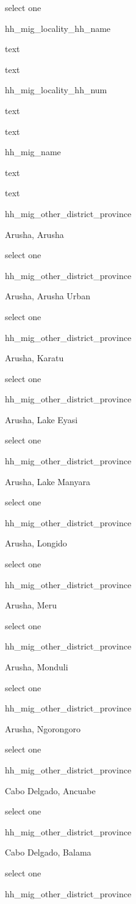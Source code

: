 \documentclass[]{article}
\begin{document}
select one

hh\_mig\_locality\_hh\_name

text

text

hh\_mig\_locality\_hh\_num

text

text

hh\_mig\_name

text

text

hh\_mig\_other\_district\_province

Arusha, Arusha

select one

hh\_mig\_other\_district\_province

Arusha, Arusha Urban

select one

hh\_mig\_other\_district\_province

Arusha, Karatu

select one

hh\_mig\_other\_district\_province

Arusha, Lake Eyasi

select one

hh\_mig\_other\_district\_province

Arusha, Lake Manyara

select one

hh\_mig\_other\_district\_province

Arusha, Longido

select one

hh\_mig\_other\_district\_province

Arusha, Meru

select one

hh\_mig\_other\_district\_province

Arusha, Monduli

select one

hh\_mig\_other\_district\_province

Arusha, Ngorongoro

select one

hh\_mig\_other\_district\_province

Cabo Delgado, Ancuabe

select one

hh\_mig\_other\_district\_province

Cabo Delgado, Balama

select one

hh\_mig\_other\_district\_province
\end{document}
